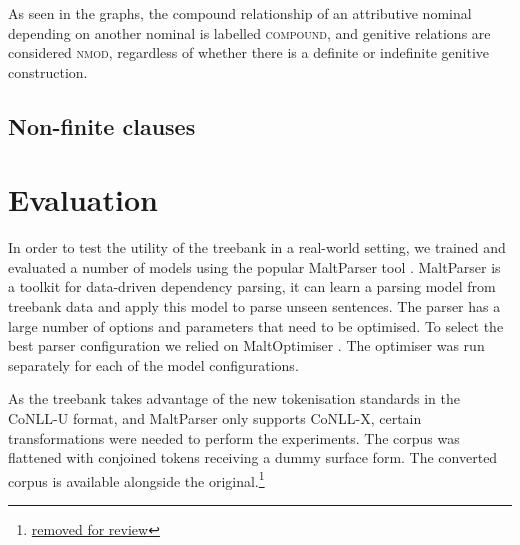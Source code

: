 \documentclass[a4paper,11pt, onecolumn,twoside]{article}
\newcommand{\udtag}[1]{{\ll \textsc{#1}}}
\begin{document}
As seen in the graphs, the compound relationship of an attributive nominal depending on another nominal is labelled \udtag{compound}, and genitive relations are considered \udtag{nmod}, regardless of whether there is a definite or indefinite genitive construction.


\subsection{Non-finite clauses}


\section{Evaluation}\label{sec:eval}

In order to test the utility of the treebank in a real-world setting, we trained
and evaluated a number of models using the popular MaltParser tool \parencite{nivre07}.
MaltParser is a toolkit for data-driven dependency parsing, it can learn a parsing
model from treebank data and apply this model to parse unseen sentences. The parser
has a large number of options and parameters that need to be optimised. 
To select the best parser configuration we relied on 
MaltOptimiser \parencite{ballesteros15}. The optimiser was run separately for each of 
the model configurations.

As the treebank takes advantage of the new tokenisation standards in the CoNLL-U format,
and MaltParser only supports CoNLL-X, certain transformations were needed to perform 
the experiments. The corpus was flattened with conjoined tokens receiving a dummy 
surface form. The converted corpus is available alongside the original.\footnote{\url{removed for review}}




\end{document}
